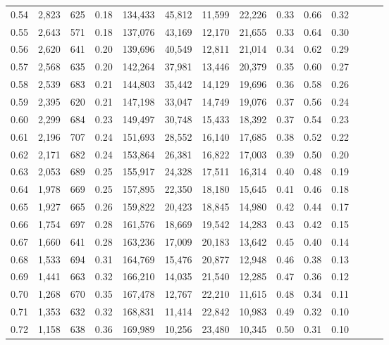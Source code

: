 \begin{tabular}{rrrrrrrrrrrrrr}
0.54 &  2,823 &  625 &  0.18 &  134,433 &   45,812 &  11,599 &  22,226 &  0.33 &  0.66 &      0.32 \\
0.55 &  2,643 &  571 &  0.18 &  137,076 &   43,169 &  12,170 &  21,655 &  0.33 &  0.64 &      0.30 \\
0.56 &  2,620 &  641 &  0.20 &  139,696 &   40,549 &  12,811 &  21,014 &  0.34 &  0.62 &      0.29 \\
0.57 &  2,568 &  635 &  0.20 &  142,264 &   37,981 &  13,446 &  20,379 &  0.35 &  0.60 &      0.27 \\
0.58 &  2,539 &  683 &  0.21 &  144,803 &   35,442 &  14,129 &  19,696 &  0.36 &  0.58 &      0.26 \\
0.59 &  2,395 &  620 &  0.21 &  147,198 &   33,047 &  14,749 &  19,076 &  0.37 &  0.56 &      0.24 \\
0.60 &  2,299 &  684 &  0.23 &  149,497 &   30,748 &  15,433 &  18,392 &  0.37 &  0.54 &      0.23 \\
0.61 &  2,196 &  707 &  0.24 &  151,693 &   28,552 &  16,140 &  17,685 &  0.38 &  0.52 &      0.22 \\
0.62 &  2,171 &  682 &  0.24 &  153,864 &   26,381 &  16,822 &  17,003 &  0.39 &  0.50 &      0.20 \\
0.63 &  2,053 &  689 &  0.25 &  155,917 &   24,328 &  17,511 &  16,314 &  0.40 &  0.48 &      0.19 \\
0.64 &  1,978 &  669 &  0.25 &  157,895 &   22,350 &  18,180 &  15,645 &  0.41 &  0.46 &      0.18 \\
0.65 &  1,927 &  665 &  0.26 &  159,822 &   20,423 &  18,845 &  14,980 &  0.42 &  0.44 &      0.17 \\
0.66 &  1,754 &  697 &  0.28 &  161,576 &   18,669 &  19,542 &  14,283 &  0.43 &  0.42 &      0.15 \\
0.67 &  1,660 &  641 &  0.28 &  163,236 &   17,009 &  20,183 &  13,642 &  0.45 &  0.40 &      0.14 \\
0.68 &  1,533 &  694 &  0.31 &  164,769 &   15,476 &  20,877 &  12,948 &  0.46 &  0.38 &      0.13 \\
0.69 &  1,441 &  663 &  0.32 &  166,210 &   14,035 &  21,540 &  12,285 &  0.47 &  0.36 &      0.12 \\
0.70 &  1,268 &  670 &  0.35 &  167,478 &   12,767 &  22,210 &  11,615 &  0.48 &  0.34 &      0.11 \\
0.71 &  1,353 &  632 &  0.32 &  168,831 &   11,414 &  22,842 &  10,983 &  0.49 &  0.32 &      0.10 \\
0.72 &  1,158 &  638 &  0.36 &  169,989 &   10,256 &  23,480 &  10,345 &  0.50 &  0.31 &      0.10 \\

\end{tabular}
